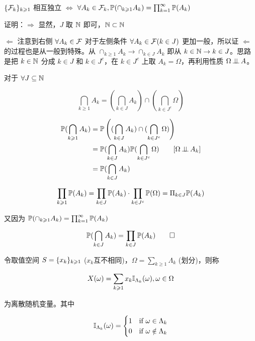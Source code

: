 \begin{property}\label{prop:equiv_sigma_mutual_indep}
    $\{{\mathcal{F}}_{k}\}_{k \geqslant 1}$ 相互独立 $\Leftrightarrow$ $\forall A_k\in \mathcal{F}_k, \mathbb{P}(\cap_{k\geqslant 1}A_k)=\prod_{k=1}^{\infty}\mathbb{P}(A_k)$
\end{property}

证明：$\Rightarrow$ 显然，$J$ 取 $\mathbb{N}$ 即可，$\mathbb{N}\subset \mathbb{N}$

$\Leftarrow$ 注意到右侧 $\forall A_k\in \mathcal{F}$ 对于左侧条件 $\forall A_k\in \mathcal{F}(k\in J)$ 更加一般，所以证 $\Leftarrow$ 的过程也是从一般到特殊。从 $\cap_{k\geq 1}A_k\rightarrow \cap_{k\in J}A_k$ 即从 $k\in\mathbb{N}\rightarrow k\in J$。思路是把 $k\in\mathbb{N}$ 分成 $k\in J$ 和 $k\in J^c$，在 $k\in J^c$ 上取 $A_k=\Omega$，再利用性质 $\Omega\operatorname{\perp\!\!\!\perp} A$。

对于 $\forall J\subseteq \mathbb{N}$

\[
\bigcap_{k\geq 1}A_k=\left(\bigcap_{k\in J}A_k\right)\cap \left(\bigcap_{k\in J^c}\Omega\right)
\]

\[
\begin{aligned}
    \mathbb{P}(\bigcap_{k\geqslant 1}A_k) &=\mathbb{P}\left((\bigcap_{k\in J}A_k)\cap (\bigcap_{k\in J^c}\Omega)\right)\\
    &=\mathbb{P}(\bigcap_{k\in J}A_k)\mathbb{P}(\bigcap_{k\in J^c}\Omega)\qquad [\Omega\operatorname{\perp\!\!\!\perp} A_k]\\
    &=\mathbb{P}(\bigcap_{k\in J}A_k)
\end{aligned}
\]

\[
\prod_{k\geqslant 1}\mathbb{P}(A_k)=\prod_{k\in J}\mathbb{P}(A_k)\cdot \prod_{k\in J^c}\mathbb{P}(\Omega)=\Pi_{k\in J}\mathbb{P}(A_k)
\]

又因为 $\mathbb{P}(\cap_{k\geqslant 1}A_k)=\prod_{k=1}^{\infty}\mathbb{P}(A_k)$

\[
\mathbb{P}(\bigcap_{k\in J}A_k)=\prod_{k\in J}\mathbb{P}(A_k)\qed
\]

\begin{definition}[离散随机变量]\label{def:discrete_rv}
    令取值空间 $S=\{{x}_{k}\}_{k \geqslant 1}$ ($x_k$互不相同)，$\Omega=\sum_{k\geq 1}\Lambda_k$ (划分)，则称 
    
    \[X(\omega)=\sum_{k\geqslant 1}x_k\mathbb I_{\Lambda_k}(\omega), \omega\in \Omega\]
    
    为离散随机变量。其中

    \[
    \mathbb I_{\Lambda_k}(\omega)=\begin{cases}
        1 & \text{if }\omega\in \Lambda_k\\
        0 & \text{if }\omega\notin \Lambda_k
    \end{cases}
    \]
\end{definition}

